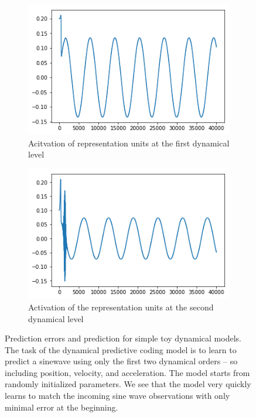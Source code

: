 \begin{figure}[H]
\bigskip
\begin{subfigure}{.32\linewidth}
 \centering
 \includegraphics[width=0.8\linewidth]{chapter_3_figures/dynamics_sine_wave_thetaz1.png}
 \caption{Acitvation of representation units at the first dynamical level}
\end{subfigure}
 \hfill
\begin{subfigure}{.32\linewidth}
 \centering
 \includegraphics[width=0.8\linewidth]{chapter_3_figures/dynamics_sine_wave_theta_z2.png}
 \caption{Activation of the representation units at the second dynamical level}\label{fig:image13}
\end{subfigure}
\caption{Prediction errors and prediction for simple toy dynamical models. The task of the dynamical predictive coding model is to learn to predict a sinewave using only the first two dynamical orders -- so including position, velocity, and acceleration. The model starts from randomly initialized parameters. We see that the model very quickly learns to match the incoming sine wave observations with only minimal error at the beginning.}
\end{figure}

